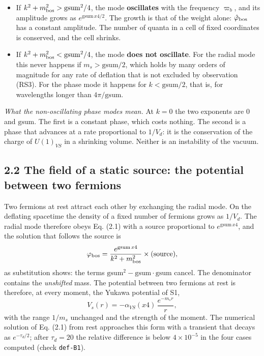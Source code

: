 \documentclass[
  10pt,
]{article}
\providecommand{\tightlist}{%
  \setlength{\itemsep}{0pt}\setlength{\parskip}{0pt}}
\begin{document}
\begin{itemize}
\tightlist
\item
  If \(k^2+m_{\rm bos}^2>\mathrm{gsum}^2/4\), the mode
  \textbf{oscillates} with the frequency \(\varpi_b\), and its amplitude
  grows as \(e^{\mathrm{gsum}\,x4/2}\). The growth is that of the weight
  alone: \(\hat\varphi_{\rm bos}\) has a constant amplitude. The number
  of quanta in a cell of fixed coordinates is conserved, and the cell
  shrinks.
\item
  If \(k^2+m_{\rm bos}^2<\mathrm{gsum}^2/4\), the mode \textbf{does not
  oscillate}. For the radial mode this never happens if
  \(m_s>\mathrm{gsum}/2\), which holds by many orders of magnitude for
  any rate of deflation that is not excluded by observation (RS3). For
  the phase mode it happens for \(k<\mathrm{gsum}/2\), that is, for
  wavelengths longer than \(4\pi/\mathrm{gsum}\).
\end{itemize}

\emph{What the non-oscillating phase modes mean.} At \(k=0\) the two
exponents are \(0\) and \(\mathrm{gsum}\). The first is a constant
phase, which costs nothing. The second is a phase that advances at a
rate proportional to \(1/V_d\): it is the conservation of the charge of
\(U(1)_{VS}\) in a shrinking volume. Neither is an instability of the
vacuum.

\hypertarget{the-field-of-a-static-source-the-potential-between-two-fermions}{%
\subsection{2.2 The field of a static source: the potential between two
fermions}\label{the-field-of-a-static-source-the-potential-between-two-fermions}}

Two fermions at rest attract each other by exchanging the radial mode.
On the deflating spacetime the density of a fixed number of fermions
grows as \(1/V_d\). The radial mode therefore obeys Eq. (2.1) with a
source proportional to \(e^{\mathrm{gsum}\,x4}\), and the solution that
follows the source is
\[\varphi_{\rm bos}=\frac{e^{\mathrm{gsum}\,x4}}{k^2+m_{\rm bos}^2}\times\text{(source)},\]
as substitution shows: the terms
\(\mathrm{gsum}^2-\mathrm{gsum}\cdot\mathrm{gsum}\) cancel. The
denominator contains the \emph{unshifted} mass. The potential between
two fermions at rest is therefore, at every moment, the Yukawa potential
of S1, \[V_s(r)=-\alpha_{VS}(x4)\,\frac{e^{-m_sr}}{r},\tag{2.3}\] with
the range \(1/m_s\) unchanged and the strength of the moment. The
numerical solution of Eq. (2.1) from rest approaches this form with a
transient that decays as \(e^{-\tau_d/2}\); after \(\tau_d=20\) the
relative difference is below \(4\times10^{-5}\) in the four cases
computed (check \texttt{def-B1}).
\end{document}
